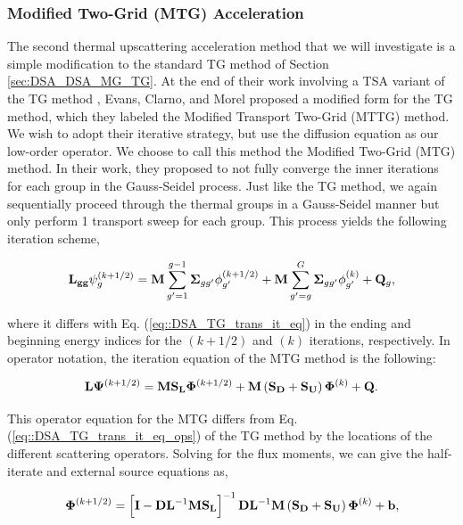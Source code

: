 \subsubsection{Modified Two-Grid (MTG) Acceleration}
\label{sec:DSA_DSA_MG_MTG}

The second thermal upscattering acceleration method that we will investigate is a simple modification to the standard TG method of Section \ref{sec:DSA_DSA_MG_TG}. At the end of their work involving a TSA variant of the TG method \cite{evans2010transport}, Evans, Clarno, and Morel proposed a modified form for the TG method, which they labeled the Modified Transport Two-Grid (MTTG) method. We wish to adopt their iterative strategy, but use the diffusion equation as our low-order operator. We choose to call this method the Modified Two-Grid (MTG) method. In their work, they proposed to not fully converge the inner iterations for each group in the Gauss-Seidel process. Just like the TG method, we again sequentially proceed through the thermal groups in a Gauss-Seidel manner but only perform 1 transport sweep for each group. This process yields the following iteration scheme,

\begin{equation}
\label{eq::DSA_MTG_trans_it_eq}
{\bf L_{gg}} \psi_g^{(k+1/2)} = {\bf M} \sum_{g'=1}^{g-1} {\bf \Sigma}_{g g'} \phi_{g'}^{(k+1/2)} + {\bf M} \sum_{g'=g}^G {\bf \Sigma}_{g g'} \phi_{g'}^{(k)} + {\bf Q}_g, 
\end{equation}

\noindent where it differs with Eq. (\ref{eq::DSA_TG_trans_it_eq}) in the ending and beginning energy indices for the $(k+1/2)$ and $(k)$ iterations, respectively. In operator notation, the iteration equation of the MTG method is the following:

\begin{equation}
\label{eq::DSA_MTG_trans_it_eq_ops}
{\bf L} {\bf \Psi}^{(k+1/2)} = {\bf M} {\bf S_L} {\bf \Phi}^{(k+1/2)} + {\bf M}\left(  {\bf S_D} + {\bf S_U} \right)  {\bf \Phi}^{(k)} + {\bf Q} .
\end{equation}

\noindent This operator equation for the MTG differs from Eq. (\ref{eq::DSA_TG_trans_it_eq_ops}) of the TG method by the locations of the different scattering operators. Solving for the flux moments, we can give the half-iterate and external source equations as,

\begin{equation}
\label{eq::DSA_MTG_half_it_sol}
{\bf \Phi}^{(k+1/2)} = \left[ {\bf I} - {\bf D}{\bf L}^{-1} {\bf M}{\bf S_L}\right]^{-1} {\bf D}{\bf L}^{-1}  {\bf M} \left(  {\bf S_D} + {\bf S_U} \right) {\bf \Phi}^{(k)} + {\bf b} ,
\end{equation}

